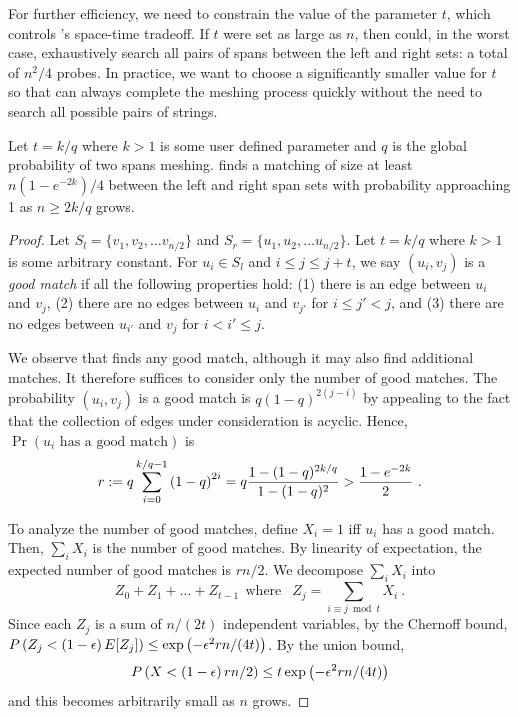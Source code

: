 For further efficiency, we need to constrain the value of the
parameter $t$, which controls \Mesh{}'s space-time tradeoff. If $t$
were set as large as $n$, then \sm could, in the worst case,
exhaustively search all pairs of spans between the left and right
sets: a total of $n^2/4$ probes.  In practice, we want to choose a
significantly smaller value for $t$ so that \Mesh{} can always
complete the meshing process quickly without the need to search all
possible pairs of strings.


\begin{lemma}
Let $t=k/q$ where $k>1$ is some user defined parameter and $q$ is the global probability of two
spans meshing. \sm finds a matching
of size at least $n(1-e^{-2k})/4$ between the left and right span sets
with probability approaching 1 as $n\geq 2k/q$ grows.
\end{lemma}

\begin{proof}
Let $S_l=\{v_1, v_2, \ldots v_{n/2}\}$ and $S_r=\{u_1,
u_2, \ldots u_{n/2}\}$. Let $t=k/q$ where
$k>1$ is some arbitrary constant. For $u_i\in S_l$ and $i \leq j \leq
j+t$, we say $(u_i,v_j)$ is a \emph{good match} if all the following
properties hold: (1) there is an edge between $u_i$ and $v_j$, (2)
there are no edges between $u_i$ and $v_{j'}$ for $i\leq j'<j$, and
(3) there are no edges between $u_{i'}$ and $v_{j}$ for $i< i'\leq j$.

We observe that \sm finds any good match, although it may
also find additional matches. It therefore suffices to consider only
the number of good matches. The probability $(u_i,v_j)$ is a good
match is $q(1-q)^{2(j-i)}$ by appealing to the fact that the collection of edges under consideration is acyclic. Hence, $\Pr(u_i \mbox{ has a good match})$
is
\begin{align*}
r:= q \sum_{i=0}^{k/q-1} \left( 1-q\right) ^{2i} = q \frac{1-(1-q)^{2k/q}}{1-(1-q)^2}
 > \frac{1-e^{-2k}}{2} \ .
\end{align*}

To analyze the number of good matches, define $X_i = 1$ iff $u_i$ has
a good match. Then, $\sum_i X_i$ is the number of good matches. By
linearity of expectation, the expected number of good matches is
$rn/2$. We decompose $\sum_i X_i$ into \[Z_0+Z_1+\ldots + Z_{t-1} ~~\mbox{
  where }~~ Z_{j} = \sum_{i\equiv j \bmod t} X_i \ .\] Since each
$Z_j$ is a sum of $n/(2t)$ independent variables, by the Chernoff
bound, $P\left( Z_j < \left( 1-\epsilon \right) E[Z_j]\right) \leq \exp\left( -
\epsilon^2 r n/(4t)\right)$.  By the union bound,
$$P\left( X < \left( 1-\epsilon \right) rn/2\right) \leq t \exp\left( - \epsilon^2 r
n/(4t)\right)$$ and this becomes arbitrarily small as $n$ grows.
\end{proof}


